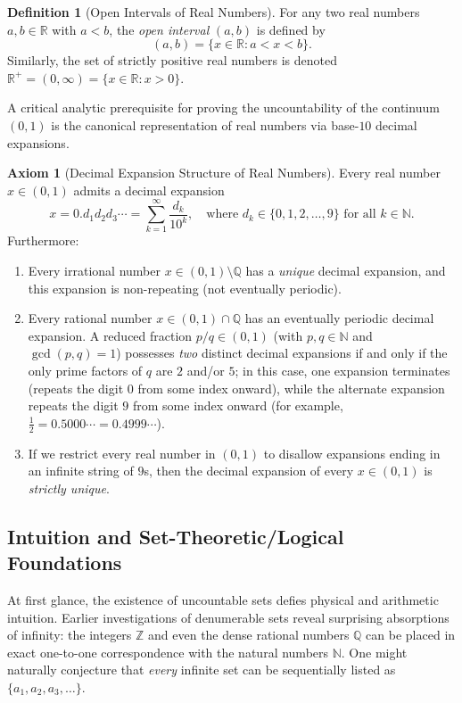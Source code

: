 \documentclass[11pt, letterpaper]{article}
\theoremstyle{definition}
\newtheorem{definition}{Definition}[section]
\newtheorem{axiom}{Axiom}[section]
\theoremstyle{remark}
\begin{document}
\begin{definition}[Open Intervals of Real Numbers]
For any two real numbers $a, b \in \mathbb{R}$ with $a < b$, the \emph{open interval} $(a, b)$ is defined by
\[
(a, b) = \{x \in \mathbb{R} : a < x < b\}.
\]
Similarly, the set of strictly positive real numbers is denoted $\mathbb{R}^+ = (0, \infty) = \{x \in \mathbb{R} : x > 0\}$.
\end{definition}

A critical analytic prerequisite for proving the uncountability of the continuum $(0, 1)$ is the canonical representation of real numbers via base-$10$ decimal expansions.

\begin{axiom}[Decimal Expansion Structure of Real Numbers]
Every real number $x \in (0, 1)$ admits a decimal expansion
\[
x = 0.d_1 d_2 d_3 \cdots = \sum_{k=1}^{\infty} \frac{d_k}{10^k}, \quad \text{where } d_k \in \{0, 1, 2, \dots, 9\} \text{ for all } k \in \mathbb{N}.
\]
Furthermore:
\begin{enumerate}[label=(\roman*)]
    \item Every irrational number $x \in (0, 1) \setminus \mathbb{Q}$ has a \emph{unique} decimal expansion, and this expansion is non-repeating (not eventually periodic).
    \item Every rational number $x \in (0, 1) \cap \mathbb{Q}$ has an eventually periodic decimal expansion. A reduced fraction $p/q \in (0, 1)$ (with $p, q \in \mathbb{N}$ and $\gcd(p, q) = 1$) possesses \emph{two} distinct decimal expansions if and only if the only prime factors of $q$ are $2$ and/or $5$; in this case, one expansion terminates (repeats the digit $0$ from some index onward), while the alternate expansion repeats the digit $9$ from some index onward (for example, $\frac{1}{2} = 0.5000\cdots = 0.4999\cdots$).
    \item If we restrict every real number in $(0, 1)$ to disallow expansions ending in an infinite string of $9$s, then the decimal expansion of every $x \in (0, 1)$ is \emph{strictly unique}.
\end{enumerate}
\end{axiom}

\subsection{Intuition and Set-Theoretic/Logical Foundations}

At first glance, the existence of uncountable sets defies physical and arithmetic intuition. Earlier investigations of denumerable sets reveal surprising absorptions of infinity: the integers $\mathbb{Z}$ and even the dense rational numbers $\mathbb{Q}$ can be placed in exact one-to-one correspondence with the natural numbers $\mathbb{N}$. One might naturally conjecture that \emph{every} infinite set can be sequentially listed as $\{a_1, a_2, a_3, \dots\}$.
\end{document}
